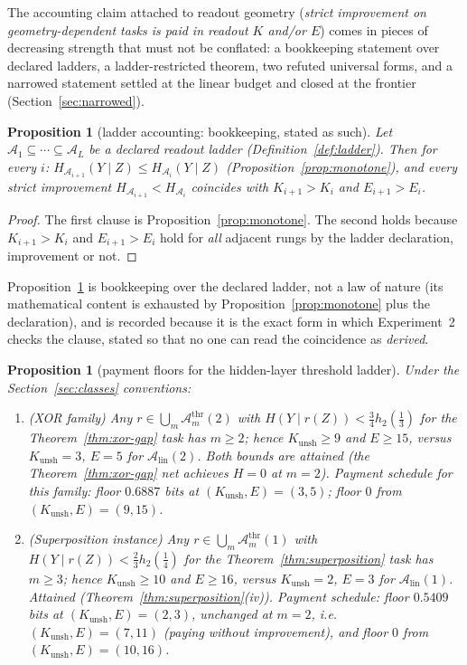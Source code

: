 \documentclass[twocolumn,10pt]{article}
\newtheorem{proposition}[theorem]{Proposition}
\theoremstyle{definition}
\theoremstyle{remark}
\newcommand{\cA}{\mathcal{A}}
\newcommand{\Alin}{\cA_{\mathrm{lin}}}
\newcommand{\Athr}[1]{\cA^{\mathrm{thr}}_{#1}}
\newcommand{\hb}{h_2}
\newcommand{\Kunsh}{K_{\mathrm{unsh}}}
\begin{document}
The accounting claim attached to readout geometry (\emph{strict
improvement on geometry-dependent tasks is paid in readout $K$ and/or
$E$}) comes in pieces of decreasing strength that must not be
conflated: a bookkeeping statement over declared ladders, a
ladder-restricted theorem, two refuted universal forms, and a
narrowed statement settled at the linear budget and closed at the
frontier (Section~\ref{sec:narrowed}).

\begin{proposition}[ladder accounting: bookkeeping, stated as such]
\label{prop:ladder}
Let $\cA_1 \subseteq \cdots \subseteq \cA_L$ be a declared readout ladder
(Definition~\ref{def:ladder}). Then for every $i$:
$H_{\cA_{i+1}}(Y \mid Z) \le H_{\cA_i}(Y \mid Z)$
(Proposition~\ref{prop:monotone}), and every strict improvement
$H_{\cA_{i+1}} < H_{\cA_i}$ coincides with $K_{i+1} > K_i$ and
$E_{i+1} > E_i$.
\end{proposition}

\begin{proof}
The first clause is Proposition~\ref{prop:monotone}. The second holds
because $K_{i+1} > K_i$ and $E_{i+1} > E_i$ hold for \emph{all} adjacent
rungs by the ladder declaration, improvement or not.
\end{proof}

Proposition~\ref{prop:ladder} is bookkeeping over the declared ladder,
not a law of nature (its mathematical content is exhausted by
Proposition~\ref{prop:monotone} plus the declaration), and is
recorded because it is the exact form in which Experiment~2 checks the
clause, stated so that no one can read the coincidence as
\emph{derived}.

\begin{proposition}[payment floors for the hidden-layer threshold
ladder]
\label{prop:payment}
Under the Section~\ref{sec:classes} conventions:
\begin{enumerate}
\item[(1)] (XOR family) Any $r \in \bigcup_m \Athr{m}(2)$ with
$H(Y \mid r(Z)) < \tfrac34 \hb(\tfrac13)$ for the Theorem~\ref{thm:xor-gap}
task has $m \ge 2$; hence $\Kunsh \ge 9$ and $E \ge 15$, versus
$\Kunsh = 3$, $E = 5$ for $\Alin(2)$. Both bounds are attained (the
Theorem~\ref{thm:xor-gap} net achieves $H = 0$ at $m = 2$). Payment
schedule for this family: floor $0.6887$ bits at
$(\Kunsh, E) = (3, 5)$; floor $0$ from $(\Kunsh, E) = (9, 15)$.
\item[(2)] (Superposition instance) Any $r \in \bigcup_m \Athr{m}(1)$ with
$H(Y \mid r(Z)) < \tfrac23 \hb(\tfrac14)$ for the
Theorem~\ref{thm:superposition} task has $m \ge 3$; hence
$\Kunsh \ge 10$ and
$E \ge 16$, versus $\Kunsh = 2$, $E = 3$ for $\Alin(1)$. Attained
(Theorem~\ref{thm:superposition}(iv)). Payment schedule: floor $0.5409$
bits at $(\Kunsh, E) = (2, 3)$, unchanged at $m = 2$, i.e.\
$(\Kunsh, E) = (7, 11)$
(paying without improvement), and floor $0$ from
$(\Kunsh, E) = (10, 16)$.
\end{enumerate}
\end{proposition}
\end{document}
